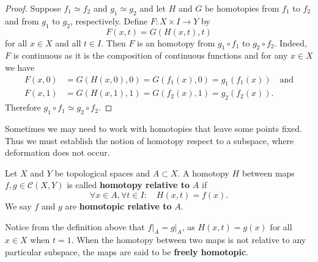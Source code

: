 \begin{proof}
    Suppose \(f_1 \simeq f_2\) and \(g_1 \simeq g_2\) and let \(H\) and \(G\) be homotopies from \(f_1\) to \(f_2\) and from \(g_1\) to \(g_2\), respectively. Define \(F\colon X\times I\to Y\) by \[
        F(x,t) = G(H(x,t),t)
    \] for all \(x\in X\) and all \(t\in I\). Then \(F\) is an homotopy from \(g_1\circ f_1\) to \(g_2\circ f_2\). Indeed, \(F\) is continuous as it is the composition of continuous functions and  for any \(x\in X\) we have \begin{align*}
        F(x,0) &= G(H(x,0),0) = G(f_1(x), 0) = g_1(f_1(x))\quad\text{and}\\
        F(x,1) &= G(H(x,1),1) = G(f_2(x), 1) = g_2(f_2(x)).
    \end{align*}
    Therefore \(g_1\circ f_1 \simeq g_2\circ f_2\).
\end{proof}






Sometimes we may need to work  with homotopies that leave some points fixed. Thus we must establish the notion of homotopy respect to a subspace, where deformation does not occur.

\begin{definition}
    Let \(X\) and \(Y\) be topological spaces and \(A\subset X\). A homotopy \(H\) between   maps \(f,g\in \mathcal{C}(X,Y)\) is called \textbf{homotopy relative to} \(A\) if \[
        \forall x\in A,\forall t\in I : \quad H(x,t) = f(x).
    \] We say \(f\) and \(g\) are \textbf{homotopic relative to} \(A\).
\end{definition}

Notice from the definition above that \( f\rvert_A = g\rvert_A \), as \(H(x,t) = g(x)\) for all \(x\in X\) when \(t=1\). When the homotopy between two maps is not relative to any particular subspace, the maps are said to be  \textbf{freely homotopic}.

